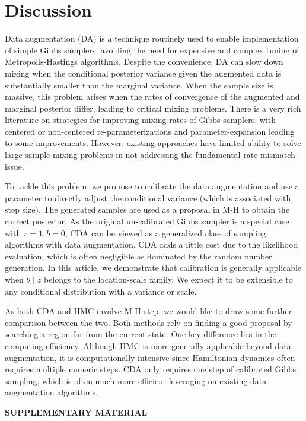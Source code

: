 \documentclass[12pt]{article}
\begin{document}
\section{Discussion}
Data augmentation (DA) is a technique routinely used to enable implementation of simple Gibbs samplers, avoiding the need for expensive and complex tuning of Metropolis-Hastings algorithms.
Despite the convenience, DA can slow down mixing when the conditional posterior variance given the augmented data is substantially smaller than the marginal variance.  When the sample size is massive, this problem arises when the rates of convergence of the augmented and marginal posterior differ, leading to 
critical mixing problems.  There is a very rich literature on strategies for improving mixing rates of Gibbs samplers, with centered or non-centered re-parameterizations \citep{papaspiliopoulos2007general} and parameter-expansion \citep{liu1999parameter} leading to some improvements.  However, existing approaches have limited ability to solve large sample mixing problems in not addressing the fundamental rate
mismatch issue.

To tackle this problem, we propose to calibrate the data augmentation and use a parameter to directly adjust the conditional variance (which is associated with step size). The generated samples are used as a proposal in  M-H to obtain the correct posterior. As the original un-calibrated Gibbs sampler is a special case with $r=1, b=0$, CDA can be viewed as a generalized class of sampling algorithms with data augmentation. CDA adds a little cost due to the likelihood evaluation, which is often negligible as dominated by the random number generation. In this article, we demonstrate that calibration is generally applicable when $\theta \mid z$ belongs to the location-scale family. We expect it to be extensible to any conditional distribution with a variance or scale.

As both CDA and HMC involve M-H step, we would like to draw some further comparison between the two. Both methods rely on finding a good proposal by searching a region far from the current state. One key difference lies in the computing efficiency. Although HMC is more generally applicable beyond data augmentation, it is computationally intensive since Hamiltonian dynamics often requires multiple numeric steps. CDA only requires one step of calibrated Gibbs sampling, which is often much more efficient leveraging on existing data augmentation algorithms.


\bigskip
\begin{center}
{\large\bf SUPPLEMENTARY MATERIAL}
\end{center}
\end{document}
